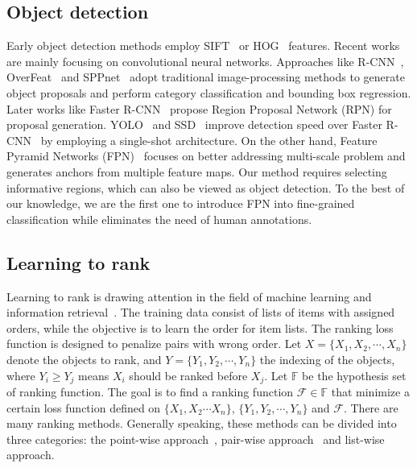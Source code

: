 \documentclass[runningheads]{llncs}
\begin{document}
\subsection{Object detection}
Early object detection methods employ SIFT~\cite{Lowe2004Distinctive} or HOG~\cite{Dalal2005Histograms} features.  Recent works are mainly focusing on convolutional neural networks. Approaches like R-CNN~\cite{girshick2014rich}, OverFeat~\cite{Sermanet2013OverFeat} and SPPnet~\cite{He2015Spatial} adopt traditional image-processing methods to generate object proposals and perform category classification and bounding box regression.  Later works like Faster R-CNN~\cite{ren2015faster} propose Region Proposal Network (RPN) for proposal generation. YOLO~\cite{Redmon2016You} and SSD~\cite{Liu2016SSD} improve detection speed over Faster R-CNN~\cite{ren2015faster} by employing a single-shot architecture. On the other hand, Feature Pyramid Networks (FPN)~\cite{Lin_2017_CVPR} focuses on better addressing multi-scale problem and generates anchors from multiple feature maps. Our method requires selecting informative regions, which can also be viewed as object detection. To the best of our knowledge, we are the first one to introduce FPN into fine-grained classification while eliminates the need of human annotations.


\subsection{Learning to rank} 
Learning to rank is drawing attention in the field of machine learning and information retrieval~\cite{Liu:2009:LRI:1618303.1618304}. The training data consist of lists of items with assigned orders, while the objective is to learn the order for item lists. The ranking loss function is designed to penalize pairs with wrong order. Let $X = \{X_1, X_2, \cdots, X_n\}$ denote the objects to rank, and $Y = \{Y_1, Y_2, \cdots, Y_n\}$ the indexing of the objects,  where $Y_i \geq Y_j$ means $X_i$ should be ranked before $X_j$. Let $\mathbb F$ be the hypothesis set of ranking function.  The goal is to find a ranking function $\mathcal F \in \mathbb F$ that minimize a certain loss function defined on $\{X_1, X_2 \cdots X_n\}$, $\{Y_1, Y_2, \cdots, Y_n\}$ and $\mathcal F$. There are many ranking methods. Generally speaking, these methods can be divided into three categories: the point-wise approach~\cite{Cossock2008Statistical}, pair-wise approach~\cite{Herbrich2000Large,Burges2005Learning} and list-wise approach\cite{Cao2007Learning,Xia2008Listwise}.
\end{document}
